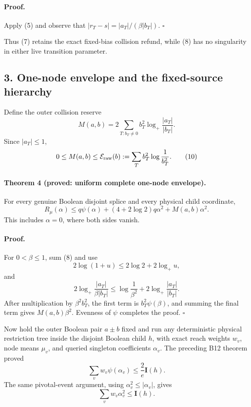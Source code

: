 \paragraph{Proof.}
Apply (5) and observe that
\(|r_T-s|=|a_T|/(\beta|b_T|)\). \(\square\)

Thus (7) retains the exact fixed-bias collision refund, while (8) has no
singularity in either live transition parameter.

\subsection*{3. One-node envelope and the fixed-source hierarchy}

Define the outer collision reserve
\[
 M(a,b)=2\sum_{T:b_T\ne0}b_T^2\log_+\frac{|a_T|}{|b_T|}.              \tag{9}
\]
Since \(|a_T|\le1\),
\[
 0\le M(a,b)\le\mathcal E_{\rm raw}(b)
 :=\sum_Tb_T^2\log\frac1{b_T^2}.                                    \tag{10}
\]

\paragraph{Theorem 4 (proved: uniform complete one-node envelope).}
For every genuine Boolean disjoint splice and every physical child
coordinate,
\[
 \boxed{
 R_\mu(\alpha)\le q\psi(\alpha)
 +(4+2\log2)q\alpha^2+M(a,b)\alpha^2.}                              \tag{11}
\]
This includes \(\alpha=0\), where both sides vanish.

\paragraph{Proof.}
For \(0<\beta\le1\), sum (8) and use
\[
 2\log(1+u)\le2\log2+2\log_+u,
\]
and
\[
 2\log_+\frac{|a_T|}{\beta|b_T|}
 \le\log\frac1{\beta^2}+2\log_+\frac{|a_T|}{|b_T|}.
\]
After multiplication by \(\beta^2b_T^2\), the first term is
\(b_T^2\psi(\beta)\), and summing the final term gives
\(M(a,b)\beta^2\).  Evenness of \(\psi\) completes the proof. \(\square\)

Now hold the outer Boolean pair \(a\pm b\) fixed and run any deterministic
physical restriction tree inside the disjoint Boolean child \(h\), with
exact reach weights \(w_v\), node means \(\mu_v\), and queried singleton
coefficients \(\alpha_v\).  The preceding B12 theorem proved
\[
 \sum_vw_v\psi(\alpha_v)\le\frac2e\mathbf I(h).
\]
The same pivotal-event argument, using \(\alpha_v^2\le|\alpha_v|\), gives
\[
 \sum_vw_v\alpha_v^2\le\mathbf I(h).                                \tag{12}
\]

